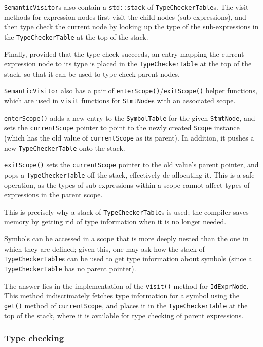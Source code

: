 \documentclass[11pt,a4paper]{scrartcl}
\begin{document}
\verb|SemanticVisitor|s also contain a \verb|std::stack| of \verb|TypeCheckerTable|s. The visit methods for expression nodes first visit the child nodes (sub-expressions), and then type check the current node by looking up the type of the sub-expressions in the \verb|TypeCheckerTable| at the top of the stack.

Finally, provided that the type check succeeds, an entry mapping the current expression node to its type is placed in the \verb|TypeCheckerTable| at the top of the stack, so that it can be used to type-check parent nodes.

\verb|SemanticVisitor| also has a pair of \verb|enterScope()|/\verb|exitScope()| helper functions, which are used in \verb|visit| functions for \verb|StmtNode|s with an associated scope.

\verb|enterScope()| adds a new entry to the \verb|SymbolTable| for the given \verb|StmtNode|, and sets the \verb|currentScope| pointer to point to the newly created \verb|Scope| instance (which has the old value of \verb|currentScope| as its parent). In addition, it pushes a new \verb|TypeCheckerTable| onto the stack.

\verb|exitScope()| sets the \verb|currentScope| pointer to the old value's parent pointer, and pops a \verb|TypeCheckerTable| off the stack, effectively de-allocating it. This is a safe operation, as the types of sub-expressions within a scope cannot affect types of expressions in the parent scope.

This is precisely why a stack of \verb|TypeCheckerTable|s is used; the compiler saves memory by getting rid of type information when it is no longer needed.

Symbols can be accessed in a scope that is more deeply nested than the one in which they are defined; given this, one may ask how the stack of \verb|TypeCheckerTable|s can be used to get type information about symbols (since a \verb|TypeCheckerTable| has no parent pointer).

The answer lies in the implementation of the \verb|visit()| method for \verb|IdExprNode|. This method indiscrimately fetches type information for a symbol using the \verb|get()| method of \verb|currentScope|, and places it in the \verb|TypeCheckerTable| at the top of the stack, where it is available for type checking of parent expressions.

\subsubsection{Type checking}~\label{sec:type-checking}
\end{document}
